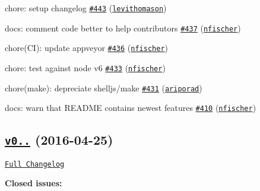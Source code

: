 \begin{DoxyItemize}
\item chore\+: setup changelog \href{https://github.com/shelljs/shelljs/pull/443}{\tt \#443} (\href{https://github.com/levithomason}{\tt levithomason})
\item docs\+: comment code better to help contributors \href{https://github.com/shelljs/shelljs/pull/437}{\tt \#437} (\href{https://github.com/nfischer}{\tt nfischer})
\item chore(\+C\+I)\+: update appveyor \href{https://github.com/shelljs/shelljs/pull/436}{\tt \#436} (\href{https://github.com/nfischer}{\tt nfischer})
\item chore\+: test against node v6 \href{https://github.com/shelljs/shelljs/pull/433}{\tt \#433} (\href{https://github.com/nfischer}{\tt nfischer})
\item chore(make)\+: depreciate shelljs/make \href{https://github.com/shelljs/shelljs/pull/431}{\tt \#431} (\href{https://github.com/ariporad}{\tt ariporad})
\item docs\+: warn that R\+E\+A\+D\+ME contains newest features \href{https://github.com/shelljs/shelljs/pull/410}{\tt \#410} (\href{https://github.com/nfischer}{\tt nfischer})
\end{DoxyItemize}

\subsection*{\href{https://github.com/shelljs/shelljs/tree/v0.7.0}{\tt v0..} (2016-\/04-\/25)}

\href{https://github.com/shelljs/shelljs/compare/v0.6.0...v0.7.0}{\tt Full Changelog}

{\bfseries Closed issues\+:}


